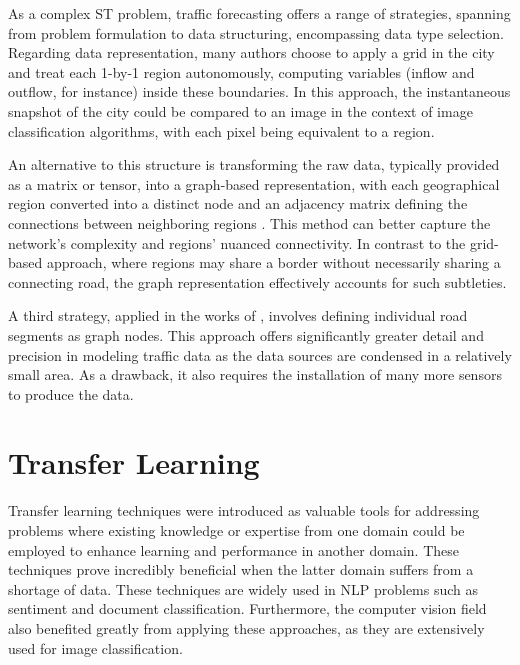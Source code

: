 As a complex \gls{ST} problem, traffic forecasting offers a range of strategies, spanning from problem formulation to data structuring, encompassing data type selection. Regarding data representation, many authors \cite{Wang2019b, Yao2019, Wang20224695} choose to apply a grid in the city and treat each \mbox{1-by-1} region autonomously, computing variables (inflow and outflow, for instance) inside these boundaries. In this approach, the instantaneous snapshot of the city could be compared to an image in the context of image classification algorithms, with each pixel being equivalent to a region. 

An alternative to this structure is transforming the raw data, typically provided as a matrix or tensor, into a graph-based representation, with each geographical region converted into a distinct node and an adjacency matrix defining the connections between neighboring regions \cite{Ouyang20231, Jin2022731, Lin2021, Zhang2022, Geng2019, Wang2023, Lu2022, Tang2022, Wei2016}. This method can better capture the network's complexity and regions' nuanced connectivity. In contrast to the grid-based approach, where regions may share a border without necessarily sharing a connecting road, the graph representation effectively accounts for such subtleties.

A third strategy, applied in the works of  \cite{Elmi20201088, Li2022},  involves defining individual road segments as graph nodes. This approach offers significantly greater detail and precision in modeling traffic data as the data sources are condensed in a relatively small area. As a drawback, it also requires the installation of many more sensors to produce the data.



\section{Transfer Learning} \label{sec:transferlearning}

Transfer learning techniques \cite{pan2009survey} were introduced as valuable tools for addressing problems where existing knowledge or expertise from one domain could be employed to enhance learning and performance in another domain. These techniques prove incredibly beneficial when the latter domain suffers from a shortage of data. These techniques are widely used in \gls{NLP} problems such as sentiment and document classification. Furthermore, the computer vision field also benefited greatly from applying these approaches, as they are extensively used for image classification.

